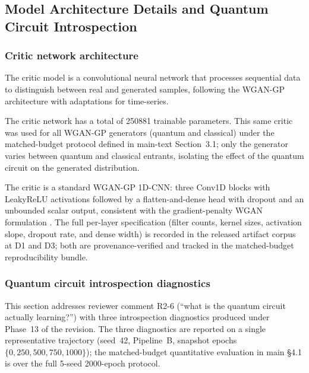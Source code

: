 \subsection{Model Architecture Details and Quantum Circuit Introspection}
\label{sec:model_arch_and_introspection}

\subsubsection{Critic network architecture}

The critic model is a convolutional neural network that processes
sequential data to distinguish between real and generated samples,
following the WGAN-GP architecture \cite{gulrajani2017improved} with
adaptations for time-series.

The critic network has a total of 250881 trainable parameters. This
same critic was used for all WGAN-GP generators (quantum and classical)
under the matched-budget protocol defined in main-text Section~3.1;
only the generator varies between quantum and classical entrants,
isolating the effect of the quantum circuit on the generated
distribution.

The critic is a standard WGAN-GP 1D-CNN: three Conv1D blocks with
LeakyReLU activations followed by a flatten-and-dense head with dropout
and an unbounded scalar output, consistent with the gradient-penalty
WGAN formulation \cite{gulrajani2017improved, arjovsky17a}. The full
per-layer specification (filter counts, kernel sizes, activation slope,
dropout rate, and dense width) is recorded in the released artifact
corpus at D1 and D3; both are
provenance-verified and tracked in the matched-budget reproducibility
bundle.

\subsubsection{Quantum circuit introspection diagnostics}\label{sec:quantum_introspection}

This section addresses reviewer comment R2-6 (``what is the quantum
circuit actually learning?'') with three introspection diagnostics
produced under Phase~13 of the revision. The three diagnostics are
reported on a single representative trajectory (seed~42, Pipeline~B,
snapshot epochs $\{0, 250, 500, 750, 1000\}$); the matched-budget
quantitative evaluation in main \S4.1 is over the full 5-seed
2000-epoch protocol.

